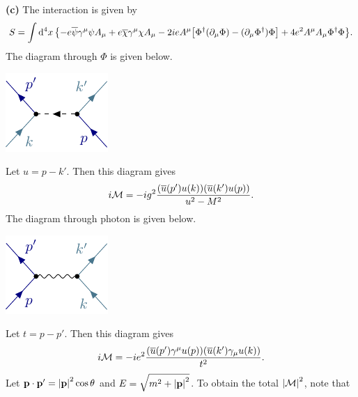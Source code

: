 \documentclass{article}
\makeatletter
\newcommand*{\shifttext}[1]{%
  \settowidth{\@tempdima}{#1}%
  \hspace{-\@tempdima}#1%
}
\newcommand{\plabel}[1]{%
\shifttext{\textbf{#1}\quad}%
}
\makeatother
\begin{document}
\plabel{(c)}%
The interaction is given by
\[ S = \int \dd[4]{x} \qty{ -e \overline{\psi}\gamma^\mu \psi A_\mu + e \overline{\chi}\gamma^\mu \chi A_\mu - 2ie A^\mu\qty[\Phi^\dagger(\partial_\mu \Phi) - (\partial_\mu \Phi^\dagger)\Phi] + 4e^2 A^\mu A_\mu \Phi^\dagger \Phi }. \]
The diagram through $\Phi$ is given below.
\begin{center}
    \includegraphics{img/scatter/scalar.pdf}
\end{center}
Let $u = p - k'$.
Then this diagram gives
\[ i\mathcal{M} = -ig^2 \frac{\qty(\overline{u}(p') u(k))\qty(\overline{u}(k')u(p))}{u^2 - M^2}. \]
The diagram through photon is given below.
\begin{center}
    \includegraphics{img/scatter/photon.pdf}
\end{center}
Let $t = p-p'$.
Then this diagram gives
\[ i\mathcal{M} = -ie^2 \frac{\qty(\overline{u}(p')\gamma^\mu u(p))\qty(\overline{u}(k')\gamma_\mu u(k))}{t^2}. \]
Let $\vb{p}\cdot \vb{p}' = \abs{\vb{p}}^2 \cos\theta$ and $E = \sqrt{m^2+\abs{\vb{p}}^2}$.
To obtain the total $\abs{\mathcal{M}}^2$, note that
\end{document}
